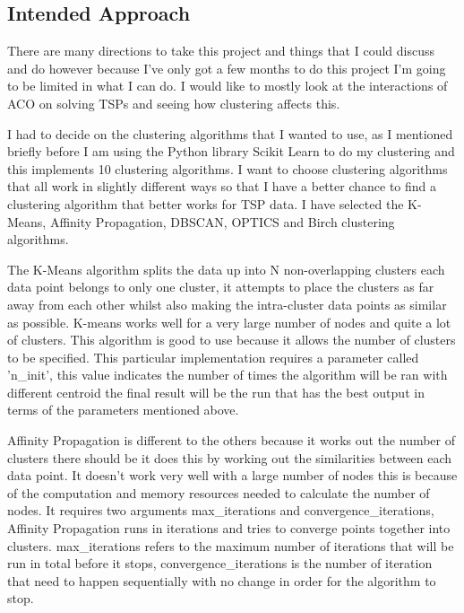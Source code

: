 \subsection{Intended Approach}
There are many directions to take this project and things that I could discuss and do however because I've only got a few months to do this project I'm going to be limited in what I can do. I would like to mostly look at the interactions of ACO on solving TSPs and seeing how clustering affects this.

I had to decide on the clustering algorithms that I wanted to use, as I mentioned briefly before I am using the Python library Scikit Learn to do my clustering and this implements 10 clustering algorithms. I want to choose clustering algorithms that all work in slightly different ways so that I have a better chance to find a clustering algorithm that better works for TSP data. I have selected the K-Means, Affinity Propagation, DBSCAN, OPTICS and Birch clustering algorithms. 

The K-Means algorithm splits the data up into N non-overlapping clusters each data point belongs to only one cluster, it attempts to place the clusters as far away from each other whilst also making the intra-cluster data points as similar as possible. K-means works well for a very large number of nodes and quite a lot of clusters. This algorithm is good to use because it allows the number of clusters to be specified. This particular implementation requires a parameter called 'n\_init', this value indicates the number of times the algorithm will be ran with different centroid the final result will be the run that has the best output in terms of the parameters mentioned above.

Affinity Propagation is different to the others because it works out the number of clusters there should be it does this by working out the similarities between each data point. It doesn't work very well with a large number of nodes this is because of the computation and memory resources needed to calculate the number of nodes. It requires two arguments max\_iterations and convergence\_iterations, Affinity Propagation runs in iterations and tries to converge points together into clusters. max\_iterations refers to the maximum number of iterations that will be run in total before it stops, convergence\_iterations is the number of iteration that need to happen sequentially with no change in order for the algorithm to stop. 


